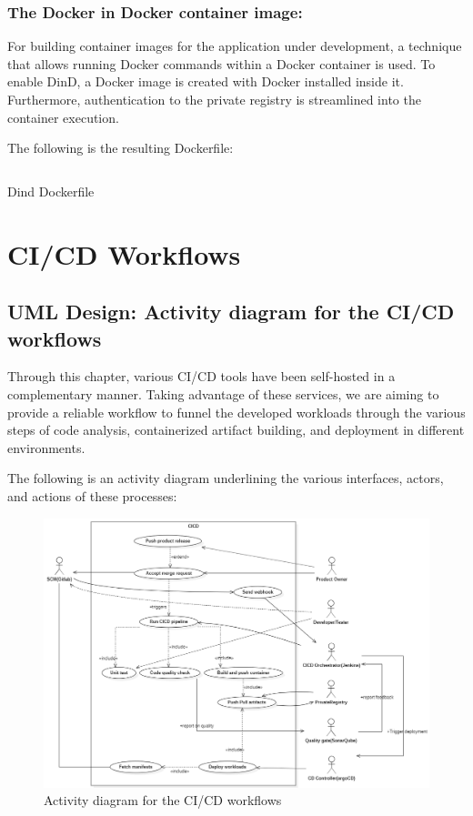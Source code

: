 \subsubsection{The Docker in Docker container image: }

For building container images for the application under development, a technique that allows running Docker commands within a Docker container is used. To enable DinD, a Docker image is created with Docker installed inside it. Furthermore, authentication to the private registry is streamlined into the container execution.

The following is the resulting Dockerfile: 

\begin{listing}[H]
    \inputminted{Dockerfile}{codeListing/dind-Dockerfile}
    \caption{Dind Dockerfile}
    \label{lst:Dind Dockerfile}
\end{listing}

\newpage

\section{CI/CD Workflows}

\subsection{UML Design: Activity diagram for the CI/CD workflows } 

Through this chapter, various CI/CD tools have been self-hosted in a complementary manner. Taking advantage of these services, we are aiming to provide a reliable workflow to funnel the developed workloads through the various steps of code analysis, containerized artifact building, and deployment in different environments.

The following is an activity diagram underlining the various interfaces, actors, and actions of these processes: 

\begin{figure}[H]\centering
\includegraphics[width=1.0\textwidth,angle=00]{assets/f45.png}
\caption{ Activity diagram for the CI/CD workflows}
\label{fig:Activity diagram for the CI/CD workflows}
\end{figure}

